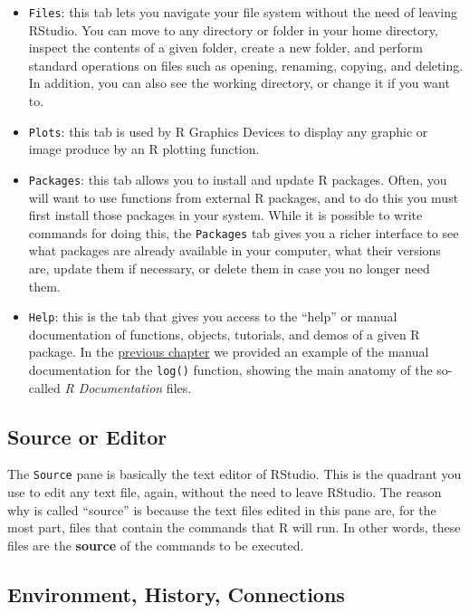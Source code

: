 \documentclass[
]{book}
\begin{document}
\begin{itemize}
\item
  \texttt{Files}: this tab lets you navigate your file system without the need of
  leaving RStudio. You can move to any directory or folder in your home directory,
  inspect the contents of a given folder, create a new folder, and perform
  standard operations on files such as opening, renaming, copying, and deleting.
  In addition, you can also see the working directory, or change it if you want to.
\item
  \texttt{Plots}: this tab is used by R Graphics Devices to display any graphic or
  image produce by an R plotting function.
\item
  \texttt{Packages}: this tab allows you to install and update R packages. Often, you
  will want to use functions from external R packages, and to do this you must
  first install those packages in your system. While it is possible to write
  commands for doing this, the \texttt{Packages} tab gives you a richer interface to
  see what packages are already available in your computer, what their versions
  are, update them if necessary, or delete them in case you no longer need them.
\item
  \texttt{Help}: this is the tab that gives you access to the ``help'' or manual
  documentation of functions, objects, tutorials, and demos of a given R package.
  In the \protect\hyperlink{help-documentation}{previous chapter} we provided an example of the
  manual documentation for the \texttt{log()} function, showing the main anatomy of the
  so-called \emph{R Documentation} files.
\end{itemize}

\hypertarget{source-or-editor}{%
\subsection{Source or Editor}\label{source-or-editor}}

The \texttt{Source} pane is basically the text editor of RStudio. This is the quadrant
you use to edit any text file, again, without the need to leave RStudio.
The reason why is called ``source'' is because the text files edited in this
pane are, for the most part, files that contain the commands that R will
run. In other words, these files are the \textbf{source} of the commands to be
executed.

\hypertarget{environment-history-connections}{%
\subsection{Environment, History, Connections}\label{environment-history-connections}}
\end{document}
